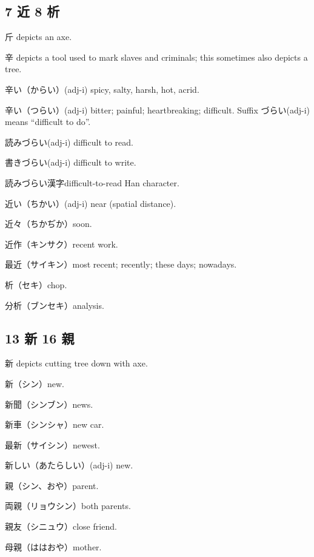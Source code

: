 \subsection{7 近 8 析}

斤 depicts an axe.

辛 depicts a tool used to mark slaves and criminals;
this sometimes also depicts a tree.

辛い（からい）(adj-i) spicy, salty, harsh, hot, acrid.

辛い（つらい）(adj-i) bitter; painful; heartbreaking; difficult.
Suffix づらい(adj-i) means ``difficult to do''.

読みづらい(adj-i) difficult to read.

書きづらい(adj-i) difficult to write.

読みづらい漢字difficult-to-read Han character.

近い（ちかい）(adj-i) near (spatial distance).

近々（ちかぢか）soon.

近作（キンサク）recent work.

最近（サイキン）most recent; recently; these days; nowadays.

析（セキ）chop.

分析（ブンセキ）analysis.

\subsection{13 新 16 親}

新 depicts cutting tree down with axe.

新（シン）new.

新聞（シンブン）news.

新車（シンシャ）new car.

最新（サイシン）newest.

新しい（あたらしい）(adj-i) new.

親（シン、おや）parent.

両親（リョウシン）both parents.

親友（シニュウ）close friend.

母親（ははおや）mother.
